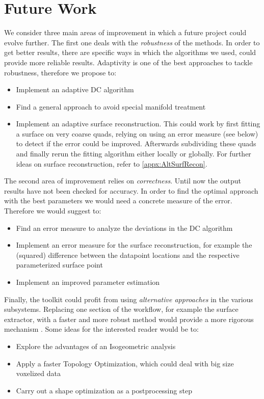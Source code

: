 \section{Future Work}
\label{sec:Future}
We consider three main areas of improvement in which a future project could evolve further. The first one deals with the \textit{robustness} of the methods. In order to get better results, there are specific ways in which the algorithms we used, could provide more reliable results. Adaptivity is one of the best approaches to tackle robustness, therefore we propose to:  
\begin{itemize}
\item Implement an adaptive DC algorithm
\item Find a general approach to  avoid special manifold treatment
\item Implement an adaptive surface reconstruction. This could work by first fitting a surface on very coarse quads, relying on using an error measure (see below) to detect if the error could be improved. Afterwards  subdividing these quads and finally rerun the fitting algorithm either locally or globally. For further ideas on surface reconstruction, refer to \autoref{appx:AltSurfRecon}.

\end{itemize}
The second area of improvement relies on \textit{correctness}. Until now the output results have not been checked for accuracy. In order to find the optimal approach with the best parameters we would need a concrete measure of the error. Therefore we would suggest to:
\begin{itemize}
\item Find an error measure to analyze the deviations in the DC algorithm
\item Implement an error measure for the surface reconstruction, for example the (squared) difference between the datapoint locations and the respective parameterized surface point
\item Implement an improved parameter estimation %
\end{itemize}
Finally, the toolkit could profit from using \textit{alternative approaches} in the various subsystems. Replacing one section of the workflow, for example the surface extractor, with a faster and more robust method would provide a more rigorous mechanism . Some ideas for the interested reader would be to:
\begin{itemize}
\item Explore the advantages of an Isogeometric analysis

\item Apply a faster Topology Optimization, which could deal with big size voxelized data

\item Carry out a shape optimization as a postprocessing step
\end{itemize}
